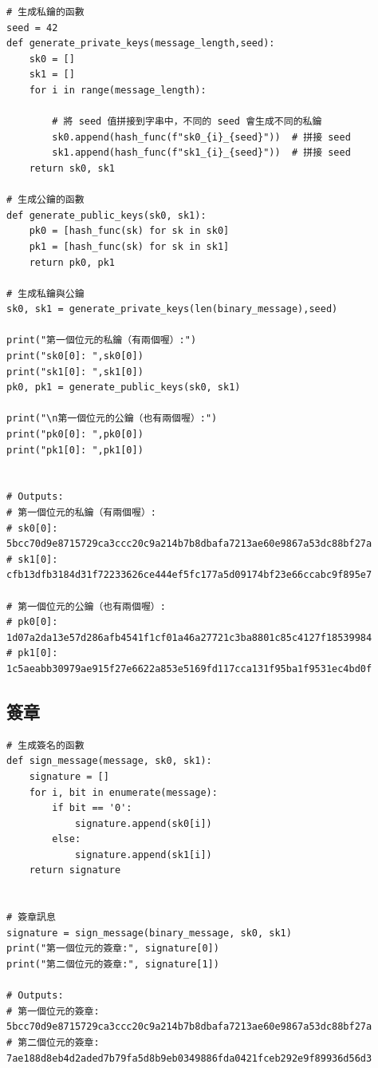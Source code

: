 \documentclass[
]{article}
\begin{document}
\begin{verbatim}
# 生成私鑰的函數
seed = 42
def generate_private_keys(message_length,seed):
    sk0 = []
    sk1 = []
    for i in range(message_length):

        # 將 seed 值拼接到字串中，不同的 seed 會生成不同的私鑰
        sk0.append(hash_func(f"sk0_{i}_{seed}"))  # 拼接 seed
        sk1.append(hash_func(f"sk1_{i}_{seed}"))  # 拼接 seed
    return sk0, sk1

# 生成公鑰的函數
def generate_public_keys(sk0, sk1):
    pk0 = [hash_func(sk) for sk in sk0]
    pk1 = [hash_func(sk) for sk in sk1]
    return pk0, pk1

# 生成私鑰與公鑰
sk0, sk1 = generate_private_keys(len(binary_message),seed)

print("第一個位元的私鑰（有兩個喔）:")
print("sk0[0]: ",sk0[0])
print("sk1[0]: ",sk1[0]) 
pk0, pk1 = generate_public_keys(sk0, sk1)

print("\n第一個位元的公鑰（也有兩個喔）:")
print("pk0[0]: ",pk0[0])
print("pk1[0]: ",pk1[0]) 


# Outputs:
# 第一個位元的私鑰（有兩個喔）:
# sk0[0]:  5bcc70d9e8715729ca3ccc20c9a214b7b8dbafa7213ae60e9867a53dc88bf27a
# sk1[0]:  cfb13dfb3184d31f72233626ce444ef5fc177a5d09174bf23e66ccabc9f895e7

# 第一個位元的公鑰（也有兩個喔）:
# pk0[0]:  1d07a2da13e57d286afb4541f1cf01a46a27721c3ba8801c85c4127f18539984
# pk1[0]:  1c5aeabb30979ae915f27e6622a853e5169fd117cca131f95ba1f9531ec4bd0f
\end{verbatim}

\hypertarget{ux7c3dux7ae0-1}{%
\subsection{簽章}\label{ux7c3dux7ae0-1}}

\begin{verbatim}
# 生成簽名的函數
def sign_message(message, sk0, sk1):
    signature = []
    for i, bit in enumerate(message):
        if bit == '0':
            signature.append(sk0[i])
        else:
            signature.append(sk1[i])
    return signature


# 簽章訊息
signature = sign_message(binary_message, sk0, sk1)
print("第一個位元的簽章:", signature[0])
print("第二個位元的簽章:", signature[1])

# Outputs:
# 第一個位元的簽章: 5bcc70d9e8715729ca3ccc20c9a214b7b8dbafa7213ae60e9867a53dc88bf27a
# 第二個位元的簽章: 7ae188d8eb4d2aded7b79fa5d8b9eb0349886fda0421fceb292e9f89936d56d3
\end{verbatim}
\end{document}
